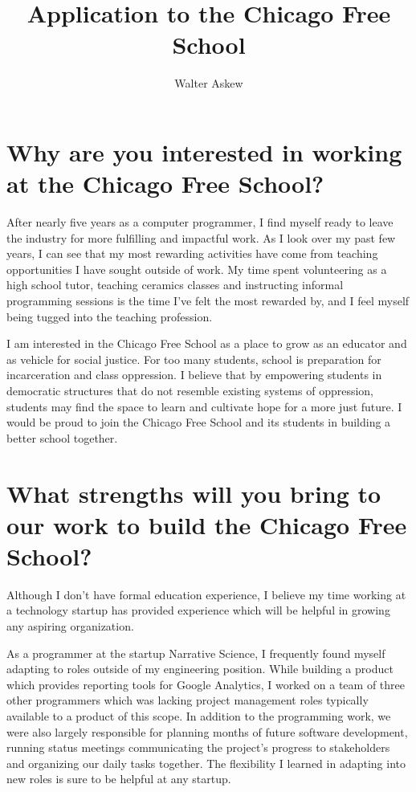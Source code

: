 \documentclass[oneside]{memoir}
\author{Walter Askew}
\title{Application to the Chicago Free School}
\begin{document}
\maketitle

\section*{Why are you interested in working at the Chicago Free
  School?}
After nearly five years as a computer programmer, I find myself ready
to leave the industry for more fulfilling and impactful work.
As I look over my past few years, I can see that my most
rewarding activities have come from teaching opportunities I have
sought outside of work.
My time spent volunteering as a high school tutor, teaching ceramics
classes and instructing informal programming sessions is the time I've
felt the most rewarded by, and I feel myself being tugged into the
teaching profession.

I am interested in the Chicago Free School as a place to grow as an
educator and as vehicle for social justice.
For too many students, school is preparation for incarceration and
class oppression.
I believe that by empowering students in democratic structures that do
not resemble existing systems of oppression, students may find the
space to learn and cultivate hope for a more just future.
I would be proud to join the Chicago Free School and its students in
building a better school together.

\section*{What strengths will you bring to our work to build the
  Chicago Free School?} 
Although I don't have formal education experience, I believe my time
working at a technology startup has provided experience which will be
helpful in growing any aspiring organization.

As a programmer at the startup Narrative Science, I frequently found
myself adapting to roles outside of my engineering position.
While building a product which provides reporting tools for Google
Analytics, I worked on a team of three other programmers which was
lacking project management roles typically available to a product of
this scope.
In addition to the programming work, we were also largely responsible
for planning months of future software development, running status
meetings communicating the project's progress to stakeholders and
organizing our daily tasks together.
The flexibility I learned in adapting into new roles is sure to be
helpful at any startup.
\end{document}
